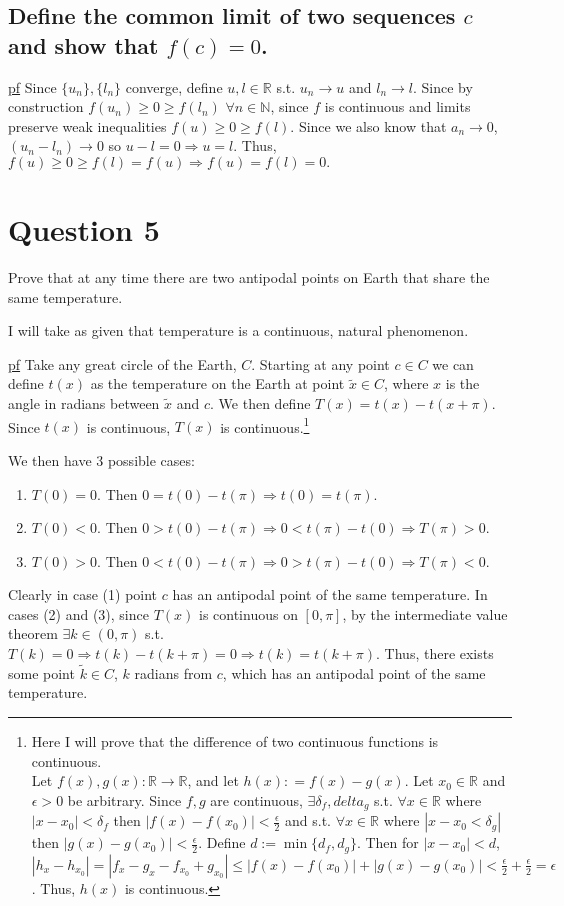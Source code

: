 \documentclass[11pt]{article} %
\begin{document}
\subsection{Define the common limit of two sequences $c$ and show that $f(c) = 0$.}
\underline{pf} Since $\{ u_n\}, \{ l_n\}$ converge, define $u,l \in \mathbb{R}$ s.t. $u_n \rightarrow u$ and $l_n \rightarrow l$. Since by construction $f(u_n) \geq 0 \geq f(l_n)$ $\forall n \in \mathbb{N}$, since $f$ is continuous and limits preserve weak inequalities $f(u) \geq 0 \geq f(l)$. Since we also know that $a_n \rightarrow 0$, $(u_n - l_n) \rightarrow 0$ so $u - l = 0 \Rightarrow u = l$. Thus, $f(u) \geq 0 \geq f(l) = f(u) \Rightarrow f(u) = f(l) = 0.$

\section{Question 5}
Prove that at any time there are two antipodal points on Earth that share the same temperature.

I will take as given that temperature is a continuous, natural phenomenon.

\underline{pf} Take any great circle of the Earth, $C$. Starting at any point $c \in C$ we can define $t(x)$ as the temperature on the Earth at point $\tilde{x} \in C$, where $x$ is the angle in radians between $\tilde{x}$ and $c$. We then define $T(x) = t(x) - t(x+\pi).$ Since $t(x)$ is continuous, $T(x)$ is continuous.\footnote{Here I will prove that the difference of two continuous functions is continuous. \\ Let $f(x),g(x): \mathbb{R} \rightarrow \mathbb{R}$, and let $h(x): = f(x) - g(x)$. Let $x_{0} \in \mathbb{R}$ and $\epsilon > 0$ be arbitrary. Since $f,g$ are continuous, $\exists \delta_f, delta_g$ s.t. $\forall x \in \mathbb{R}$ where $|x-x_0|<\delta_f$ then $|f(x)-f(x_0)|<\frac{\epsilon}{2}$ and s.t. $\forall x \in \mathbb{R}$ where $|x-x_0<\delta_g|$ then $|g(x)-g(x_0)|<\frac{\epsilon}{2}$. Define $d:= \min \{ d_f,d_g\}$. Then for $|x - x_0| < d$, $|h_x - h_{x_0}| = |f_x - g_x  - f_{x_0} + g_{x_0}| \leq |f(x) - f(x_0)|+|g(x) - g(x_0)| < \frac{\epsilon}{2} + \frac{\epsilon}{2} = \epsilon$. Thus, $h(x)$ is continuous.}

We then have 3 possible cases:
\begin{enumerate}
\item
$T(0) = 0$. Then $0 = t(0)-t(\pi) \Rightarrow t(0) = t(\pi)$.
\item
$T(0) < 0$. Then $0> t(0) - t(\pi) \Rightarrow 0 < t(\pi) - t(0) \Rightarrow T(\pi) >0$.
\item
$T(0) > 0$. Then $0<t(0) - t(\pi) \Rightarrow 0> t(\pi) - t(0) \Rightarrow T(\pi) <0$.
\end{enumerate}
Clearly in case (1) point $c$ has an antipodal point of the same temperature. In cases (2) and (3), since $T(x)$ is continuous on $[0,\pi]$, by the intermediate value theorem $\exists k \in (0,\pi)$ s.t. $T(k) = 0 \Rightarrow t(k) - t(k+\pi) = 0 \Rightarrow t(k) = t(k+\pi)$. Thus, there exists some point $\tilde{k} \in C$, $k$ radians from $c$, which has an antipodal point of the same temperature.
\end{document}
